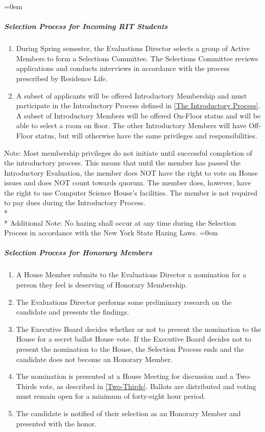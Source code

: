 \documentclass{article}
\newcommand{\asubsubsubsection}[1]{\parindent=0em\subparagraph{#1} \label{#1}}
\begin{document}
\asubsubsubsection{Selection Process for Incoming RIT Students}
\begin{enumerate}
	\item During Spring semester, the Evaluations Director selects a group of Active Members to form a Selections Committee.
		The Selections Committee reviews applications and conducts interviews in accordance with the process prescribed by Residence Life.
        \item A subset of applicants will be offered Introductory Membership and must participate in the Introductory Process defined in \ref{The Introductory Process}. 
            A subset of Introductory Members will be offered On-Floor status and will be able to select a room on floor. 
            The other Introductory Members will have Off-Floor status, but will otherwise have the same privileges and responsibilities.
\end{enumerate}
Note: Most membership privileges do not initiate until successful completion of the introductory process.
This means that until the member has passed the Introductory Evaluation, the member does NOT have the right to vote on House issues and does NOT count towards quorum.
The member does, however, have the right to use Computer Science House's facilities.
The member is not required to pay dues during the Introductory Process.
\\* \\*
Additional Note: No hazing shall occur at any time during the Selection Process in accordance with the New York State Hazing Laws.
\asubsubsubsection{Selection Process for Honorary Members}
\begin{enumerate}
	\item A House Member submits to the Evaluations Director a nomination for a person they feel is deserving of Honorary Membership.
	\item The Evaluations Director performs some preliminary research on the candidate and presents the findings.
	\item The Executive Board decides whether or not to present the nomination to the House for a secret ballot House vote.
		If the Executive Board decides not to present the nomination to the House, the Selection Process ends and the candidate does not become an Honorary Member.
	\item The nomination is presented at a House Meeting for discussion and a Two-Thirds vote, as described in \ref{Two-Thirds}.
		Ballots are distributed and voting must remain open for a minimum of forty-eight hour period.
	\item The candidate is notified of their selection as an Honorary Member and presented with the honor.
\end{enumerate}
\end{document}
